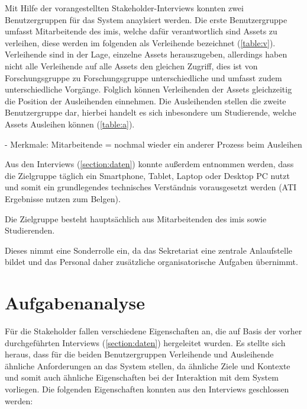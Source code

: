 Mit Hilfe der vorangestellten Stakeholder-Interviews konnten zwei Benutzergruppen für das System
anaylsiert werden. Die erste Benutzergruppe umfasst Mitarbeitende des \ac{imis}, welche dafür
verantwortlich sind Assets zu verleihen, diese werden im folgenden als Verleihende bezeichnet
(\ref{table:v}). Verleihende sind in der Lage, einzelne Assets herauszugeben, allerdings haben nicht
alle Verleihende auf alle Assets den gleichen Zugriff, dies ist von Forschungsgruppe zu
Forschungsgruppe unterschiedliche und umfasst zudem unterschiedliche Vorgänge. Folglich können
Verleihenden der Assets gleichzeitig die Position der Ausleihenden einnehmen. Die Ausleihenden
stellen die zweite Benutzergruppe dar, hierbei handelt es sich inbesondere um Studierende, welche
Assets Ausleihen können (\ref{table:a}).

- Merkmale: Mitarbeitende = nochmal wieder ein anderer Prozess beim Ausleihen

Aus den Interviews (\ref{section:daten}) konnte außerdem entnommen werden, dass die Zielgruppe
täglich ein Smartphone, Tablet, Laptop oder Desktop PC nutzt und somit ein grundlegendes technisches
Verständnis vorausgesetzt werden (ATI Ergebnisse nutzen zum Belgen).


Die Zielgruppe besteht hauptsächlich aus Mitarbeitenden des \ac{imis} sowie Studierenden.


Dieses nimmt eine Sonderrolle ein, da das Sekretariat eine zentrale Anlaufstelle bildet und das
Personal daher zusätzliche organisatorische Aufgaben übernimmt.



\section{Aufgabenanalyse}
\label{section:aufgaben}

Für die Stakeholder fallen verschiedene Eigenschaften an, die auf Basis der vorher durchgeführten
Interviews (\ref{section:daten}) hergeleitet wurden. Es stellte sich heraus, dass für die beiden
Benutzergruppen \glqq Verleihende\grqq{} und \glqq Ausleihende\grqq{} ähnliche Anforderungen an das
System stellen, da ähnliche Ziele und Kontexte und somit auch ähnliche Eigenschaften bei der
Interaktion mit dem System vorliegen. Die folgenden Eigenschaften konnten aus den Interviews
geschlossen werden:

